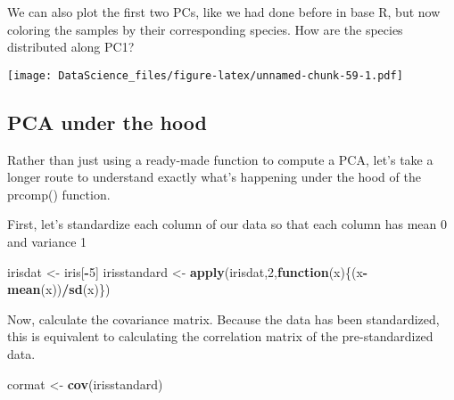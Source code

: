 \documentclass[
]{book}
\newenvironment{Shaded}{\begin{snugshade}}{\end{snugshade}}
\newcommand{\ControlFlowTok}[1]{\textcolor[rgb]{0.13,0.29,0.53}{\textbf{#1}}}
\newcommand{\DataTypeTok}[1]{\textcolor[rgb]{0.13,0.29,0.53}{#1}}
\newcommand{\DecValTok}[1]{\textcolor[rgb]{0.00,0.00,0.81}{#1}}
\newcommand{\KeywordTok}[1]{\textcolor[rgb]{0.13,0.29,0.53}{\textbf{#1}}}
\newcommand{\NormalTok}[1]{#1}
\newcommand{\OperatorTok}[1]{\textcolor[rgb]{0.81,0.36,0.00}{\textbf{#1}}}
\newcommand{\StringTok}[1]{\textcolor[rgb]{0.31,0.60,0.02}{#1}}
\begin{document}
We can also plot the first two PCs, like we had done before in base R, but now coloring the samples by their corresponding species. How are the species distributed along PC1?

\begin{Shaded}
\end{Shaded}

\texttt{[image: DataScience\_files/figure-latex/unnamed-chunk-59-1.pdf]}

\hypertarget{pca-under-the-hood}{%
\subsection{PCA under the hood}\label{pca-under-the-hood}}

Rather than just using a ready-made function to compute a PCA, let's take a longer route to understand exactly what's happening under the hood of the prcomp() function.

First, let's standardize each column of our data so that each column has mean 0 and variance 1

\begin{Shaded}
\begin{Highlighting}[]
\NormalTok{irisdat \textless{}{-}}\StringTok{ }\NormalTok{iris[}\OperatorTok{{-}}\DecValTok{5}\NormalTok{]}
\NormalTok{irisstandard \textless{}{-}}\StringTok{ }\KeywordTok{apply}\NormalTok{(irisdat,}\DecValTok{2}\NormalTok{,}\ControlFlowTok{function}\NormalTok{(x)\{(x}\OperatorTok{{-}}\KeywordTok{mean}\NormalTok{(x))}\OperatorTok{/}\KeywordTok{sd}\NormalTok{(x)\})}
\end{Highlighting}
\end{Shaded}

Now, calculate the covariance matrix. Because the data has been standardized, this is equivalent to calculating the correlation matrix of the pre-standardized data.

\begin{Shaded}
\begin{Highlighting}[]
\NormalTok{cormat \textless{}{-}}\StringTok{ }\KeywordTok{cov}\NormalTok{(irisstandard)}
\end{Highlighting}
\end{Shaded}
\end{document}
